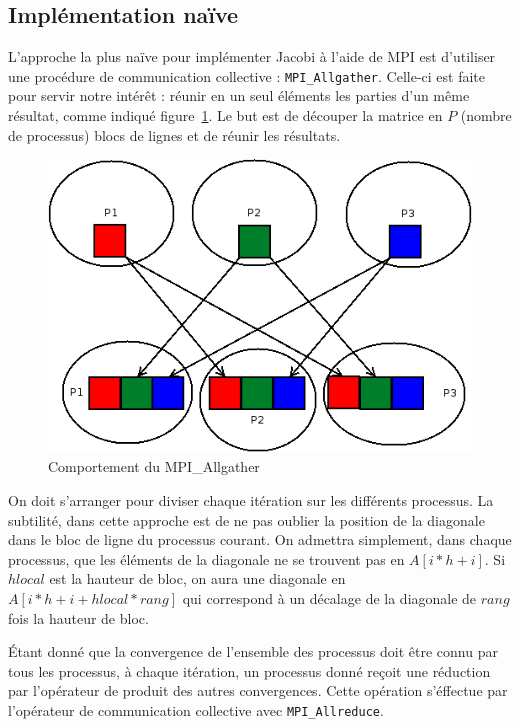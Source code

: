 \documentclass[a4paper]{article}
\begin{document}
\subsection{Implémentation naïve}

L'approche la plus naïve pour implémenter Jacobi à l'aide de MPI est
d'utiliser une procédure de communication collective
: \texttt{MPI\_Allgather}. Celle-ci est faite pour servir notre
intérêt : réunir en un seul éléments les parties d'un même résultat,
comme indiqué figure~\ref{allgather}. Le but est de découper la
matrice en $P$ (nombre de processus) blocs de lignes et de réunir les
résultats.


\begin{figure}
\centering
\includegraphics[scale=0.4]{allgather.png}
\caption{\label{allgather}Comportement du MPI\_Allgather}
\end{figure}

On doit s'arranger pour diviser chaque itération sur les différents
processus. La subtilité, dans cette approche est de ne pas oublier la
position de la diagonale dans le bloc de ligne du processus courant.
On admettra simplement, dans chaque processus, que les éléments de la
diagonale ne se trouvent pas en $A[i * h + i] $. Si $hlocal$ est la
hauteur de bloc, on aura une diagonale en $A[i * h + i + hlocal *
rang]$ qui correspond à un décalage de la diagonale de $rang$ fois la
hauteur de bloc.

Étant donné que la convergence de l'ensemble des processus doit être connu
par tous les processus, à chaque itération, un processus donné reçoit une
réduction par l'opérateur de produit des autres convergences. Cette opération
s'éffectue par l'opérateur de communication collective avec 
\texttt{MPI\_Allreduce}.\\
\end{document}
